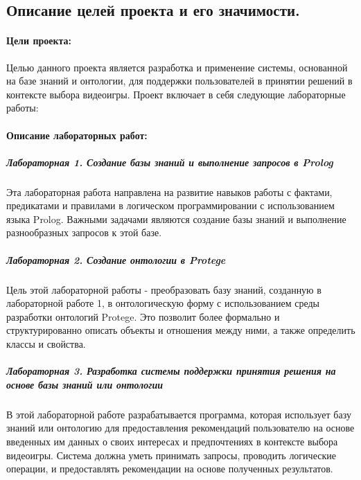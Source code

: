 \documentclass[12pt,onecolumn]{article}
\begin{document}
\subsection{Описание целей проекта и его значимости.}
\paragraph{Цели проекта:}
Целью данного проекта является разработка и применение системы, основанной на базе знаний и онтологии, для поддержки пользователей в принятии решений в контексте выбора видеоигры. Проект включает в себя следующие лабораторные работы:
\paragraph{Описание лабораторных работ:}
\subparagraph{Лабораторная 1. Создание базы знаний и выполнение запросов в Prolog}
Эта лабораторная работа направлена на развитие навыков работы с фактами, предикатами и правилами в логическом программировании с использованием языка Prolog. Важными задачами являются создание базы знаний и выполнение разнообразных запросов к этой базе.
\subparagraph{Лабораторная 2. Создание онтологии в Protege}
Цель этой лабораторной работы - преобразовать базу знаний, созданную в лабораторной работе 1, в онтологическую форму с использованием среды разработки онтологий Protege. Это позволит более формально и структурированно описать объекты и отношения между ними, а также определить классы и свойства.
\subparagraph{Лабораторная 3. Разработка системы поддержки принятия решения на основе базы знаний или онтологии}
В этой лабораторной работе разрабатывается программа, которая использует базу знаний или онтологию для предоставления рекомендаций пользователю на основе введенных им данных о своих интересах и предпочтениях в контексте выбора видеоигры. Система должна уметь принимать запросы, проводить логические операции, и предоставлять рекомендации на основе полученных результатов.
\end{document}
